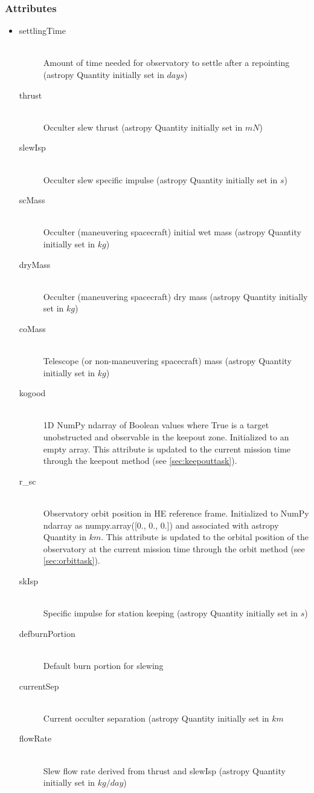 \documentclass[cleanfoot]{asme2ej}
\begin{document}
\subsubsection*{Attributes}
\begin{itemize}
    \item
    \begin{description}
        \item[settlingTime] \hfill \\
        Amount of time needed for observatory to settle after a repointing (astropy Quantity initially set in $ days $)
        \item[thrust] \hfill \\
        Occulter slew thrust (astropy Quantity initially set in $ mN $)
        \item[slewIsp] \hfill \\
        Occulter slew specific impulse (astropy Quantity initially set in $ s $)
        \item[scMass] \hfill \\
        Occulter (maneuvering spacecraft) initial wet mass (astropy Quantity initially set in $ kg $)
        \item[dryMass] \hfill \\
        Occulter (maneuvering spacecraft) dry mass (astropy Quantity initially set in $ kg $)
        \item[coMass] \hfill \\
        Telescope (or non-maneuvering spacecraft) mass (astropy Quantity initially set in $ kg $)
        \item[kogood] \hfill \\
        1D NumPy ndarray of Boolean values where True is a target unobstructed and observable in the keepout zone. Initialized to an empty array. This attribute is updated to the current mission time through the keepout method (see \ref{sec:keepouttask}).
        \item[r\_sc] \hfill \\
        Observatory orbit position in HE reference frame. Initialized to NumPy ndarray as numpy.array([0., 0., 0.]) and associated with astropy Quantity in $ km $. This attribute is updated to the orbital position of the observatory at the current mission time through the orbit method (see \ref{sec:orbittask}).
        \item[skIsp] \hfill \\
        Specific impulse for station keeping (astropy Quantity initially set in $ s $)
        \item[defburnPortion] \hfill \\
        Default burn portion for slewing
        \item[currentSep] \hfill \\
        Current occulter separation (astropy Quantity initially set in $ km $
        \item[flowRate] \hfill \\
        Slew flow rate derived from thrust and slewIsp (astropy Quantity initially set in $ kg/day $)
        
    \end{description}
\end{itemize}
\end{document}
